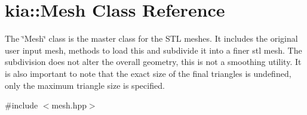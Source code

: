 \hypertarget{classkia_1_1Mesh}{\section{kia\-:\-:Mesh Class Reference}
\label{classkia_1_1Mesh}
}


The \char`\"{}\-Mesh\char`\"{} class is the master class for the S\-T\-L meshes. It includes the original user input mesh, methods to load this and subdivide it into a finer stl mesh. The subdivision does not alter the overall geometry, this is not a smoothing utility. It is also important to note that the exact size of the final triangles is undefined, only the maximum triangle size is specified.  




{\ttfamily \#include $<$mesh.\-hpp$>$}

